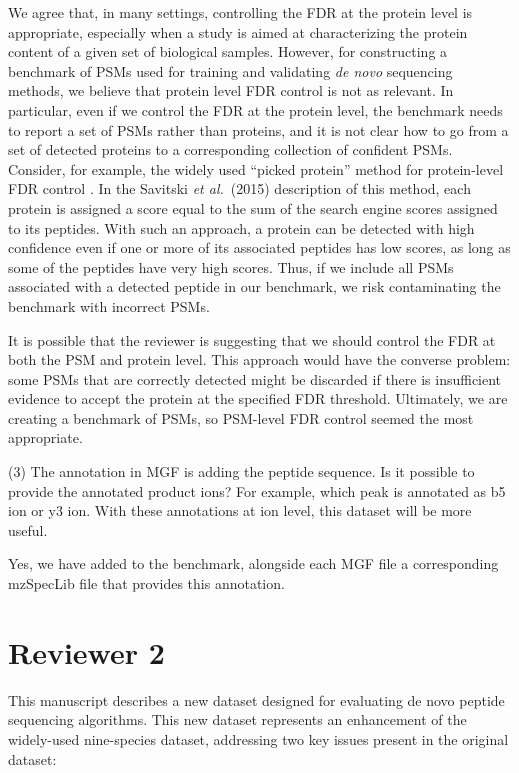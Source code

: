 \documentclass{article}
\newcommand{\response}[1]{\vspace*{1ex} \color{blue} \noindent #1 \color{black}
	\vspace*{2ex}}
\begin{document}
\response{We agree that, in many settings, controlling the FDR at the protein level is appropriate, especially when a study is aimed at characterizing the protein content of a given set of biological samples.
  However, for constructing a benchmark of PSMs used for training and validating \textit{de novo} sequencing methods, we believe that protein level FDR control is not as relevant.
  In particular, even if we control the FDR at the protein level, the benchmark needs to report a set of PSMs rather than proteins, and it is not clear how to go from a set of detected proteins to a corresponding collection of confident PSMs.
  Consider, for example, the widely used ``picked protein'' method for protein-level FDR control \cite{savitski2015scalable}.
  In the Savitski \textit{et al.}\ (2015) description of this method, each protein is assigned a score equal to the sum of the search engine scores assigned to its peptides.
  With such an approach, a protein can be detected with high confidence even if one or more of its associated peptides has low scores, as long as some of the peptides have very high scores.
  Thus, if we include all PSMs associated with a detected peptide in our benchmark, we risk contaminating the benchmark with incorrect PSMs.

  It is possible that the reviewer is suggesting that we should control the FDR at both the PSM and protein level.
  This approach would have the converse problem: some PSMs that are correctly detected might be discarded if there is insufficient evidence to accept the protein at the specified FDR threshold.
  Ultimately, we are creating a benchmark of PSMs, so PSM-level FDR control seemed the most appropriate.
}

(3) The annotation in MGF is adding the peptide sequence. Is it possible to provide the annotated product ions? For example, which peak is annotated as b5 ion or y3 ion. With these annotations at ion level, this dataset will be more useful.

\response{Yes, we have added to the benchmark, alongside each MGF file a corresponding mzSpecLib \cite{klein2024proteomics} file that provides this annotation.}

\clearpage
\section*{Reviewer 2}

This manuscript describes a new dataset designed for evaluating de novo peptide sequencing algorithms. This new dataset represents an enhancement of the widely-used nine-species dataset, addressing two key issues present in the original dataset:
\end{document}
